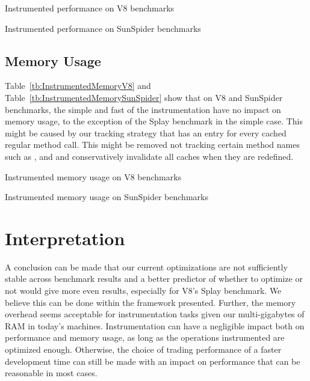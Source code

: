 \begin{table}[htb]
\caption{Instrumented performance on V8 benchmarks}
\centering
    
\label{tb:InstrumentedPerformanceV8}
\end{table}


\begin{table}[htb]
\caption{Instrumented performance on SunSpider benchmarks}
\centering
    
\label{tb:InstrumentedPerformanceSunSpider}
\end{table}

\subsection{Memory Usage}

Table~\ref{tb:InstrumentedMemoryV8} and
Table~\ref{tb:InstrumentedMemorySunSpider} show that on V8 and SunSpider
benchmarks, the simple and fast of the instrumentation have no impact on memory
usage, to the exception of the Splay benchmark in the simple case.  This might
be caused by our tracking strategy that has an entry for every cached regular
method call. This might be removed not tracking certain method names such as
,  and  and conservatively invalidate
all caches when they are redefined.

\begin{table}[htb]
\caption{Instrumented memory usage on V8 benchmarks}
\centering
    
\label{tb:InstrumentedMemoryV8}
\end{table}

\begin{table}[htb]
\caption{Instrumented memory usage on SunSpider benchmarks}
\centering
    
\label{tb:InstrumentedMemorySunSpider}
\end{table}


\section{Interpretation}

A conclusion can be made that our current optimizations are not sufficiently
stable across benchmark results and a better predictor of whether to optimize
or not would give more even results, especially for V8's Splay benchmark. We
believe this can be done within the framework presented. Further, the memory
overhead seems acceptable for instrumentation tasks given our multi-gigabytes
of RAM in today's machines. Instrumentation can have a negligible impact both
on performance and memory usage, as long as the operations instrumented are
optimized enough. Otherwise, the choice of trading performance of a faster
development time can still be made with an impact on performance that can be
reasonable in most cases.

